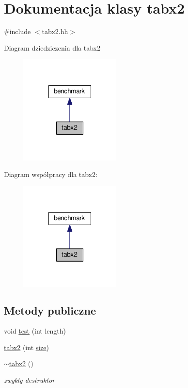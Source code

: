 \hypertarget{classtabx2}{\section{Dokumentacja klasy tabx2}
\label{classtabx2}
}


{\ttfamily \#include $<$tabx2.\-hh$>$}



Diagram dziedziczenia dla tabx2\nopagebreak
\begin{figure}[H]
\begin{center}
\leavevmode
\includegraphics[width=144pt]{classtabx2__inherit__graph}
\end{center}
\end{figure}


Diagram współpracy dla tabx2\-:\nopagebreak
\begin{figure}[H]
\begin{center}
\leavevmode
\includegraphics[width=144pt]{classtabx2__coll__graph}
\end{center}
\end{figure}
\subsection*{Metody publiczne}
\begin{DoxyCompactItemize}
\item 
void \hyperlink{classtabx2_a41eea5dffaea0a866db5c574129c0ee4}{test} (int length)
\item 
\hyperlink{classtabx2_a68be0fc6ed6ce41d56011a6f5bad1b00}{tabx2} (int \hyperlink{classtabx2_a9a6db4f12091baed13f8bad9b9538766}{size})
\item 
\hyperlink{classtabx2_a6e259fbc3e5791ae3a11df988a8369c0}{$\sim$tabx2} ()
\begin{DoxyCompactList}\small\item\em zwykly destruktor \end{DoxyCompactList}\end{DoxyCompactItemize}

